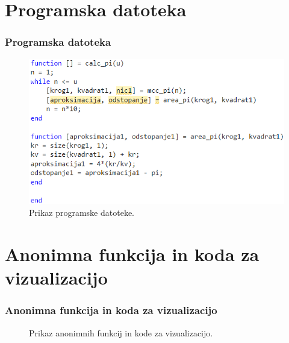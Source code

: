 \documentclass{beamer}
\begin{document}
\section{Programska datoteka}
\begin{frame}
\frametitle{Programska datoteka}

\begin{figure}
  \centering
  \includegraphics[width = 0.6 \linewidth]{slika_2.png}
  \caption{Prikaz programske datoteke.}
\end{figure}

\end{frame}

\section{Anonimna funkcija in koda za vizualizacijo}
\begin{frame}
\frametitle{Anonimna funkcija in koda za vizualizacijo}

\begin{figure}
  \caption{Prikaz anonimnih funkcij in kode za vizualizacijo.}
\end{figure}

\end{frame}
\end{document}
